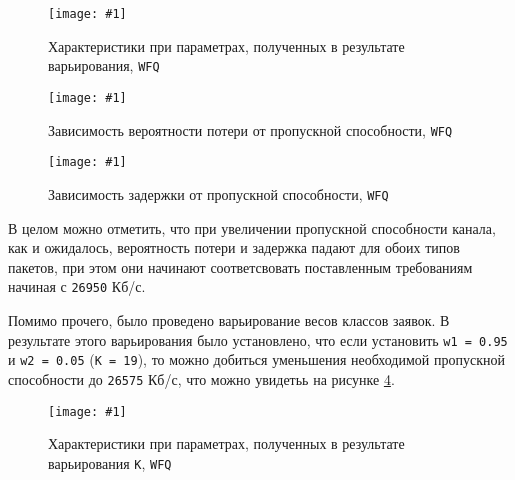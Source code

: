 \documentclass[12pt, a4paper]{article}
\newcommand{\figc}[4]{
  \begin{figure}[H]
  \begin{center}
    \texttt{[image: \#1]}
    \caption{#2}
    \label{fig:#3}
  \end{center}
  \end{figure}
}
\begin{document}
\figc{wfq/C26_95E10WFQ}{Характеристики при параметрах, полученных в результате варьирования, \texttt{WFQ}}{w_c}{1.0}
\figc{charts/wfq_loss}{Зависимость вероятности потери от пропускной способности, \texttt{WFQ}}{w_l}{0.8}
\figc{charts/wfq_delay}{Зависимость задержки от пропускной способности, \texttt{WFQ}}{w_d}{0.8}

В целом можно отметить, что при увеличении пропускной способности канала, как
и ожидалось, вероятность потери и задержка падают для обоих типов пакетов,
при этом они начинают соответсвовать поставленным требованиям начиная с \texttt{26950} Кб/с.

Помимо прочего, было проведено варьирование весов классов заявок. В результате этого варьирования
было установлено, что если установить \texttt{w1 = 0.95} и \texttt{w2 = 0.05} (\texttt{K = 19}),
то можно добиться уменьшения необходимой пропускной способности до \texttt{26575} Кб/с,
что можно увидетьь на рисунке \ref{fig:w_k}.

\figc{wfq/C26_575E10WFQ_modified}{Характеристики при параметрах, полученных в результате варьирования \texttt{K}, \texttt{WFQ}}{w_k}{1.0}
\end{document}
